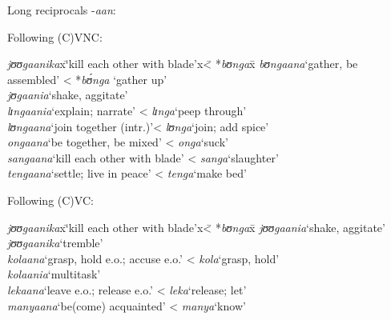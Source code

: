\begin{exe}
	\ex \label{exReciprocalLong}
	Long reciprocals -\textit{aan}:
	\begin{xlist}
		\ex Following (C)VNC:
		\begin{tabbing}
			\textit{jʊʊgaanika}x\=\lq kill each other with blade'x\= < *\textit{bʊnga}x\=\kill%
			\textit{bʊngaana}\>`gather, be assembled'\> < *\textit{bʊ́nga} `gather up'\\
			\textit{jʊgaania}\>`shake, aggitate'\\
			\textit{lɪngaania}\>\lq explain; narrate'\> < \textit{lɪnga}\>`peep through'\\
			\textit{lʊngaana}\>`join together (intr.)'\>< \textit{lʊnga}\>`join; add spice'\\
			\textit{ongaana}\>`be together, be mixed'\> < \textit{onga}\>`suck'\\
			\textit{sangaana}\>\lq kill each other with blade'\> < \textit{sanga}\>\lq slaughter'\\
			\textit{tengaana}\>\lq settle; live in peace'\> < \textit{tenga}\>`make bed'
		\end{tabbing}
		\ex Following (C)VC:
		\begin{tabbing}
			\textit{jʊʊgaanika}x\=\lq kill each other with blade'x\= < *\textit{bʊnga}x\=\kill%
			\textit{jʊʊgaania}\>`shake, aggitate'\\
			\textit{jʊʊgaanika}\>`tremble'\\
			\textit{kolaana}\>`grasp, hold e.o.; accuse e.o.'\> < \textit{kola}\>\lq grasp, hold' \\
			\textit{kolaania}\>`multitask'\\
			\textit{lekaana}\>`leave e.o.; release e.o.'\> < \textit{leka}\>\lq release; let'\\
			\textit{manyaana}\>`be(come) acquainted'\> < \textit{manya}\>`know'
		\end{tabbing}
	\end{xlist}
\end{exe}

